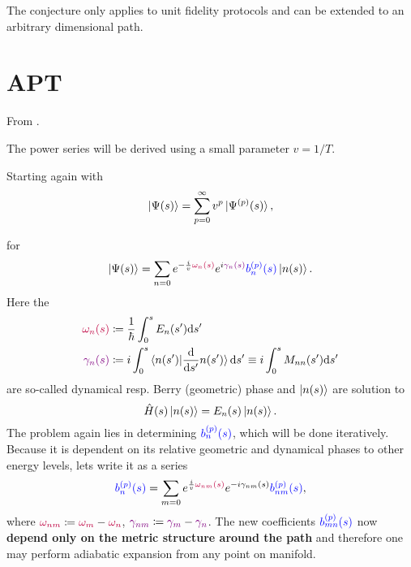 The conjecture only applies to unit fidelity protocols and can be extended to an arbitrary dimensional path.






\section{APT}
From \cite{Rigolin2008}.

The power series will be derived using a small parameter $v=1/T$.

Starting again with
\begin{equation}
    \ket{\Psi(s)}=\sum_{p=0}^\infty v^p \ket{\Psi^{(p)}(s)},
    \label{eq:mainSeries}
\end{equation}

for 
\begin{equation}
    \ket{\Psi(s)}=\sum_{n=0} e^{-\frac{i}{v} \textcolor{purple}{\omega_n(s)}}e^{i\textcolor{violet}{\gamma_n(s)}}\textcolor{blue}{b_n^{(p)}(s)}\ket{n(s)}.
\end{equation}
Here the
\begin{align}
    \textcolor{purple}{\omega_n(s)} &\coloneqq \frac{1}{\hbar}\int_0^s E_n(s')\mathrm{d} s'\\
    \textcolor{violet}{\gamma_n(s)} &\coloneqq i\int_0^s \braket{n(s')|\frac{\mathrm{d}}{\mathrm{d} s'}n(s')}\mathrm{d} s' \equiv i\int_0^s M_{nn}(s')\mathrm{d} s'
    \label{eq:gammadef}
\end{align}
are so-called dynamical resp. Berry (geometric) phase and $\ket{n(s)}$ are solution to
\begin{equation}
    \hat{H}(s)\ket{n(s)}=E_n(s) \ket{n(s)}.
\end{equation}
The problem again lies in determining $\textcolor{blue}{b_n^{(p)}(s)}$, which will be done iteratively. Because it is dependent on its relative geometric and dynamical phases to other energy levels, lets write it as a series
\begin{equation}
    \textcolor{blue}{b_n^{(p)}(s)}=\sum_{m=0} e^{\frac{i}{v}\textcolor{purple}{\omega_{nm}(s)}}e^{-i\gamma_{nm}(s)}\textcolor{blue}{b_{nm}^{(p)}(s)},
\end{equation}
where $\textcolor{purple}{\omega_{nm}} \coloneqq \textcolor{purple}{\omega_m}-\textcolor{purple}{\omega_n}$, $\textcolor{violet}{\gamma_{nm}} \coloneqq \textcolor{violet}{\gamma_m}-\textcolor{violet}{\gamma_n}$. The new coefficients $\textcolor{blue}{b_{mn}^{(p)}(s)}$ now \textbf{depend only on the metric structure around the path} and therefore one may perform adiabatic expansion from any point on manifold.

